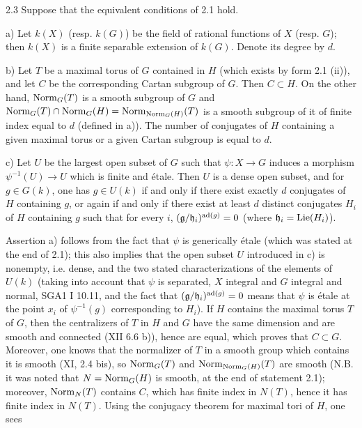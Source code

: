 \begin{corollary}{2.3}\label{XIII.2.3}
Suppose that the equivalent conditions of 2.1 hold.

\noindent a) Let $k(X)$ (resp. $k(G)$) be the field of rational functions
of $X$ (resp. $G$); then $k(X)$ is a finite separable extension of $k(G)$.
Denote its degree by $d$.

\noindent b) Let $T$ be a maximal torus of $G$ contained in $H$ (which
exists by form 2.1 (ii)), and let $C$ be the corresponding Cartan subgroup
of $G$. Then $C\subset H$. On the other hand, $\operatorname{Norm}_G(T)$ is a smooth
subgroup of $G$ and
$\operatorname{Norm}_G(T)\cap\operatorname{Norm}_G(H)=\operatorname{Norm}_{\operatorname{Norm}_G(H)}(T)$ is a smooth subgroup of
it of finite index equal to $d$ (defined in a)). The number of conjugates
of $H$ containing a given maximal torus or a given Cartan subgroup is
equal to $d$.

\noindent c) Let $U$ be the largest open subset of $G$ such that
$\psi:X\to G$ induces a morphism $\psi^{-1}(U)\to U$ which is finite and
\'etale. Then $U$ is a dense open subset, and for $g\in G(k)$, one has
$g\in U(k)$ if and only if there exist exactly $d$ conjugates of $H$
containing $g$, or again if and only if there exist at least $d$ distinct
conjugates $H_i$ of $H$ containing $g$ such that for every $i$,
$(\mathfrak g/\mathfrak h_i)^{\operatorname{ad}(g)}=0$ (where $\mathfrak h_i=\operatorname{Lie}(H_i)$).
\end{corollary}
Assertion a) follows from the fact that $\psi$ is generically \'etale
(which was stated at the end of 2.1); this also implies that the open
subset $U$ introduced in c) is nonempty, i.e. dense, and the two stated
characterizations of the elements of $U(k)$ (taking into account that
$\psi$ is separated, $X$ integral and $G$ integral and normal, SGA1 I
10.11, and the fact that $(\mathfrak g/\mathfrak h_i)^{\operatorname{ad}(g)}=0$ means
that $\psi$ is \'etale at the point $x_i$ of $\psi^{-1}(g)$ corresponding
to $H_i$). If $H$ contains the maximal torus $T$ of $G$, then the
centralizers of $T$ in $H$ and $G$ have the same dimension and are smooth
and connected (XII 6.6 b)), hence are equal, which proves that $C\subset G$.
Moreover, one knows that the normalizer of $T$ in a smooth group which
contains it is smooth (XI, 2.4 bis), so $\operatorname{Norm}_G(T)$ and
$\operatorname{Norm}_{\operatorname{Norm}_G(H)}(T)$ are smooth (N.B. it was noted that $N=\operatorname{Norm}_G(H)$
is smooth, at the end of statement 2.1); moreover, $\operatorname{Norm}_N(T)$ contains
$C$, which has finite index in $N(T)$, hence it has finite index in
$N(T)$. Using the conjugacy theorem for maximal tori of $H$, one sees
